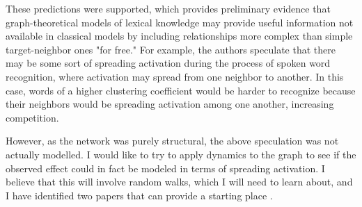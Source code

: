 \documentclass{article}
\begin{document}
These predictions were supported, which provides preliminary evidence that
graph-theoretical models of lexical knowledge may provide useful information not available
in classical models by including relationships more complex than simple target-neighbor
ones "for free." For example, the authors speculate that there may be some sort
of spreading activation during the process of spoken word recognition, where activation
may spread from one neighbor to another. In this case, words of a higher clustering
coefficient would be harder to recognize because their neighbors would be spreading
activation among one another, increasing competition.

However, as the network was purely structural, the above speculation was not
actually modelled. I would like to try to apply dynamics to the graph to see
if the observed effect could in fact be modeled in terms of spreading activation.
I believe that this will involve random walks, which I will need to learn about,
and I have identified two papers that can provide a starting place \citep{r08, noh2004}.



\end{document}
